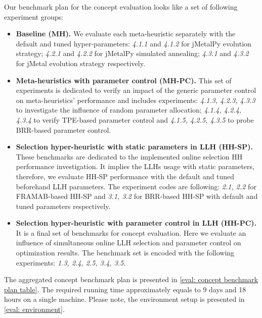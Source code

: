Our benchmark plan for the concept evaluation looks like a set of following experiment groups:
\begin{itemize}
	\item \textbf{Baseline (MH).} We evaluate each meta-heuristic separately with the default and tuned hyper-parameters: \emph{4.1.1} and \emph{4.1.2} for jMetalPy evolution strategy;  \emph{4.2.1} and \emph{4.2.2} for jMetalPy simulated annealing; \emph{4.3.1} and \emph{4.3.2} for jMetal evolution strategy respectively.

	\item \textbf{Meta-heuristics with parameter control (MH-PC).} This set of experiments is dedicated to verify an impact of the generic parameter control on meta-heuristics' performance and includes experiments: \emph{4.1.3, 4.2.3, 4.3.3} to investigate the influence of random parameter allocation; \emph{4.1.4, 4.2.4, 4.3.4} to verify TPE-based parameter control and \emph{4.1.5, 4.2.5, 4.3.5} to probe BRR-based parameter control.

	\item \textbf{Selection hyper-heuristic with static parameters in LLH (HH-SP).} These benchmarks are dedicated to the implemented online selection HH performance investigation. It implies the LLHs usage with static parameters, therefore, we evaluate HH-SP performance with the default and tuned beforehand LLH parameters. The experiment codes are following: \emph{2.1, 2.2} for FRAMAB-based HH-SP and \emph{3.1, 3.2} for BRR-based HH-SP with default and tuned parameters respectively.
	
	\item \textbf{Selection hyper-heuristic with parameter control in LLH (HH-PC).} It is a final set of benchmarks for concept evaluation. Here we evaluate an influence of simultaneous online LLH selection and parameter control on optimization results. The benchmark set is encoded with the following experiments: \emph{1.3, 2.4, 2.5, 3.4, 3.5.}
\end{itemize}

The aggregated concept benchmark plan is presented in \cref{eval: concept benchmark plan table}. The required running time approximately equals to 9 days and 18 hours on a single machine. Please note, the environment setup is presented in \cref{eval: environment}.

